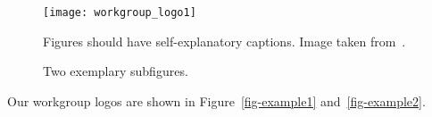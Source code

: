 \begin{figure}
    \centering
    \texttt{[image: workgroup\_logo1]}
    \caption{Figures should have self-explanatory captions.
        Image taken from~\cite{lrs-website}.}
    \label{fig:example1}
\end{figure}

\begin{figure}
    \centering
    \hspace{1cm}
    \caption{Two exemplary subfigures.}
    \label{fig:example2}
\end{figure}

Our workgroup logos are shown in Figure~\ref{fig-example1}
and~\ref{fig-example2}.
